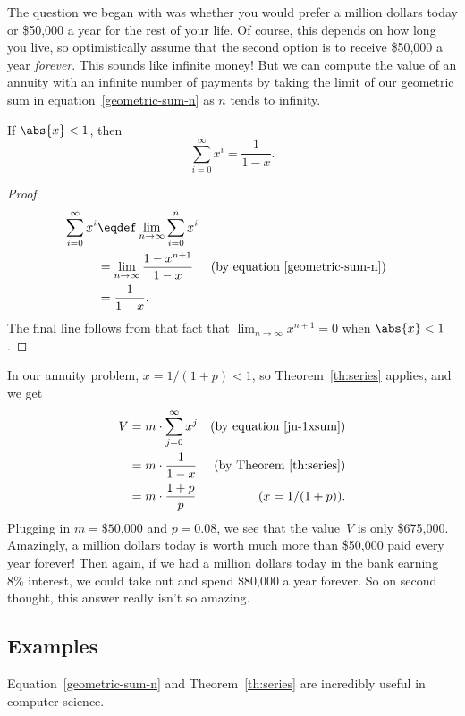 The question we began with was whether you would prefer a million
dollars today or \$50,000 a year for the rest of your life.  Of
course, this depends on how long you live, so optimistically assume
that the second option is to receive \$50,000 a year \emph{forever}.
This sounds like infinite money!  But we can compute the value of an
annuity with an infinite number of payments by taking the limit of our
geometric sum in equation~\ref{geometric-sum-n} as $n$ tends to
infinity.
\begin{theorem}\label{th:series}
If $\abs{x} < 1$, then
\[
\sum_{i=0}^\infty x^i = \frac{1}{1-x}.
\]
\end{theorem}

\begin{proof}
\begin{align*}
\sum_{i=0}^\infty x^i
   & \eqdef  \lim_{n \rightarrow \infty} \sum_{i=0}^{n} x^i \\
   & = \lim_{n \rightarrow \infty} \frac{1 - x^{n+1}}{1-x}
        & & \text{(by equation~\ref{geometric-sum-n})}\\
   & = \frac{1}{1-x}.
\end{align*}
The final line follows from that fact that $\lim_{n \rightarrow \infty}
x^{n+1} =0$ when $\abs{x} < 1$.
\end{proof}

In our annuity problem, $x=1/(1+p) < 1$, so Theorem~\ref{th:series}
applies, and we get
\begin{align*}
V & = m \cdot \sum_{j=0}^{\infty} x^j & \text{(by equation~\ref{jn-1xsum})}\\
  &= m\cdot \frac{1}{1-x} & \text{(by Theorem~\ref{th:series})}\\ &=
m\cdot \frac{1 + p}{p} &(x = 1/(1+p)).
\end{align*}
Plugging in $m = \text{\$50,000}$ and $p = 0.08$, we see that the
value~$V$ is only \$675,000.  Amazingly, a million dollars today is
worth much more than \$50,000 paid every year forever!  Then again, if
we had a million dollars today in the bank earning 8\% interest, we
could take out and spend \$80,000 a year forever.  So on second
thought, this answer really isn't so amazing.

\subsection{Examples}

Equation~\ref{geometric-sum-n} and Theorem~\ref{th:series} are
incredibly useful in computer science.  \iffalse In fact, we already
used equation~\ref{geometric-sum-n-1} implicitly when we claimed in
Chapter~\ref{chap:digraphs} than an $N$-input complete binary tree has
\[
    1 + 2 + 4 + \dots + N = 2 N - 1
\]
nodes.  \fi

